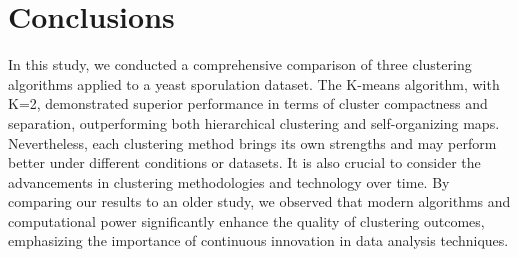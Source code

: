 \documentclass{llncs}
\begin{document}
 
\section{Conclusions}
 
In this study, we conducted a comprehensive comparison of three clustering algorithms applied to a yeast sporulation dataset. The K-means algorithm, with K=2, demonstrated superior performance in terms of cluster compactness and separation, outperforming both hierarchical clustering and self-organizing maps. Nevertheless, each clustering method brings its own strengths and may perform better under different conditions or datasets. It is also crucial to consider the advancements in clustering methodologies and technology over time. By comparing our results to an older study, we observed that modern algorithms and computational power significantly enhance the quality of clustering outcomes, emphasizing the importance of continuous innovation in data analysis techniques.

\end{document}

